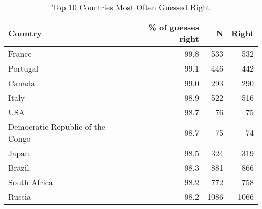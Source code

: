\begin{table}[htbp]
\centering
\caption{Top 10 Countries Most Often Guessed Right}
\label{tab:right-guesses}
\begin{tabular}{lrrr}
\toprule
Country & \% of guesses right & N & Right \\
\midrule
France & 99.8 & 533 & 532 \\
Portugal & 99.1 & 446 & 442 \\
Canada & 99.0 & 293 & 290 \\
Italy & 98.9 & 522 & 516 \\
USA & 98.7 & 76 & 75 \\
Democratic Republic of the Congo & 98.7 & 75 & 74 \\
Japan & 98.5 & 324 & 319 \\
Brazil & 98.3 & 881 & 866 \\
South Africa & 98.2 & 772 & 758 \\
Russia & 98.2 & 1086 & 1066 \\
\bottomrule
\end{tabular}
\end{table}